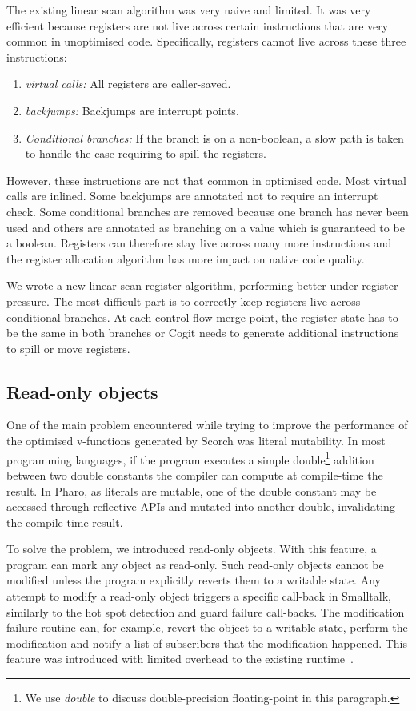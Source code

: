 \documentclass[a4paper,12pt,twoside]{../includes/ThesisStyle}
\begin{document}
The existing linear scan algorithm was very naive and limited. It was very efficient because registers are not live across certain instructions that are very common in unoptimised code. Specifically, registers cannot live across these three instructions:
\begin{enumerate}
	\item \emph{virtual calls:} All registers are caller-saved.
	\item \emph{backjumps:} Backjumps are interrupt points.
	\item \emph{Conditional branches:} If the branch is on a non-boolean, a slow path is taken to handle the case requiring to spill the registers.
\end{enumerate}

However, these instructions are not that common in optimised code. Most virtual calls are inlined. Some backjumps are annotated not to require an interrupt check. Some conditional branches are removed because one branch has never been used and others are annotated as branching on a value which is guaranteed to be a boolean. Registers can therefore stay live across many more instructions and the register allocation algorithm has more impact on native code quality.

We wrote a new linear scan register algorithm, performing better under register pressure. The most difficult part is to correctly keep registers live across conditional branches. At each control flow merge point, the register state has to be the same in both branches or Cogit needs to generate additional instructions to spill or move registers.

\subsection{Read-only objects}

One of the main problem encountered while trying to improve the performance of the optimised v-functions generated by Scorch was literal mutability. In most programming languages, if the program executes a simple double\footnote{We use \emph{double} to discuss double-precision floating-point in this paragraph.} addition between two double constants the compiler can compute at compile-time the result. In Pharo, as literals are mutable, one of the double constant may be accessed through reflective APIs and mutated into another double, invalidating the compile-time result. 

To solve the problem, we introduced read-only objects. With this feature, a program can mark any object as read-only. Such read-only objects cannot be modified unless the program explicitly reverts them to a writable state. Any attempt to modify a read-only object triggers a specific call-back in Smalltalk, similarly to the hot spot detection and guard failure call-backs. The modification failure routine can, for example, revert the object to a writable state, perform the modification and notify a list of subscribers that the modification happened. This feature was introduced with limited overhead to the existing runtime~\cite{Bera16b}. 
\end{document}
